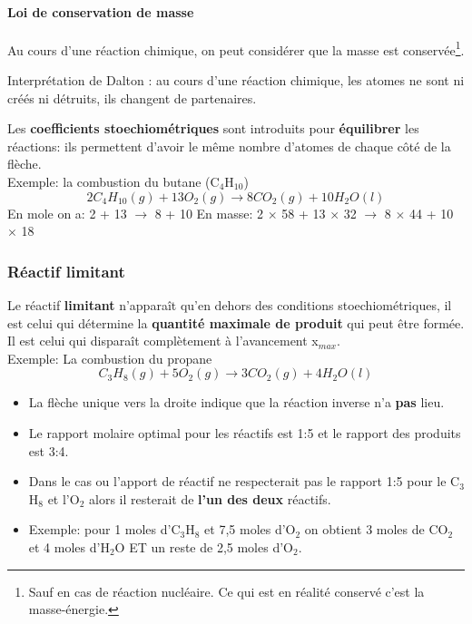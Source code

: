 \documentclass[10pt,a4paper]{book}
\newcommand{\x}{$\times$ }
\begin{document}
\paragraph{Loi de conservation de masse} Au cours d'une réaction chimique, on peut considérer que la masse est conservée\footnote{Sauf en cas de réaction nucléaire. Ce qui est en réalité conservé c'est la masse-énergie.}. \par
Interprétation de Dalton : au cours d'une réaction chimique, les atomes ne sont ni créés ni détruits, ils changent de partenaires. \par
Les \textbf{coefficients stoechiométriques} sont introduits pour \textbf{équilibrer} les réactions: ils permettent d'avoir le même nombre d'atomes de chaque côté de la flèche.\\
Exemple: la combustion du butane (C$_4$H$_10$)
\begin{displaymath}
2C_4H_10(g) + 13O_2(g) \longrightarrow 8CO_2(g) + 10H_2O(l)
\end{displaymath}
En mole on a: 2 + 13 $\longrightarrow$ 8 + 10
En masse: 2 $\times$ 58 + 13 \x 32 $\longrightarrow$ 8 \x 44 + 10 \x 18

\subsubsection{Réactif limitant}

Le réactif \textbf{limitant} n'apparaît qu'en dehors des conditions stoechiométriques, il est celui qui détermine la \textbf{quantité maximale de produit} qui peut être formée. \\
Il est celui qui disparaît complètement à l'avancement x$_{max}$. \\
Exemple: La combustion du propane
\begin{displaymath}
C_3H_8(g) + 5O_2(g) \longrightarrow 3CO_2(g) + 4H_2O(l)
\end{displaymath}
\begin{itemize}
\item La flèche unique vers la droite indique que la réaction inverse n'a \textbf{pas} lieu.
\item Le rapport molaire optimal pour les réactifs est 1:5 et le rapport des produits est 3:4.
\item Dans le cas ou l'apport de réactif ne respecterait pas le rapport 1:5 pour le C$_3$H$_8$ et l'O$_2$ alors il resterait de \textbf{l'un des deux} réactifs.
\item Exemple: pour 1 moles d'C$_3$H$_8$ et 7,5 moles d'O$_2$ on obtient 3 moles de CO$_2$ et 4 moles d'H$_2$O ET un reste de 2,5 moles d'O$_2$.
\end{itemize}
\end{document}
